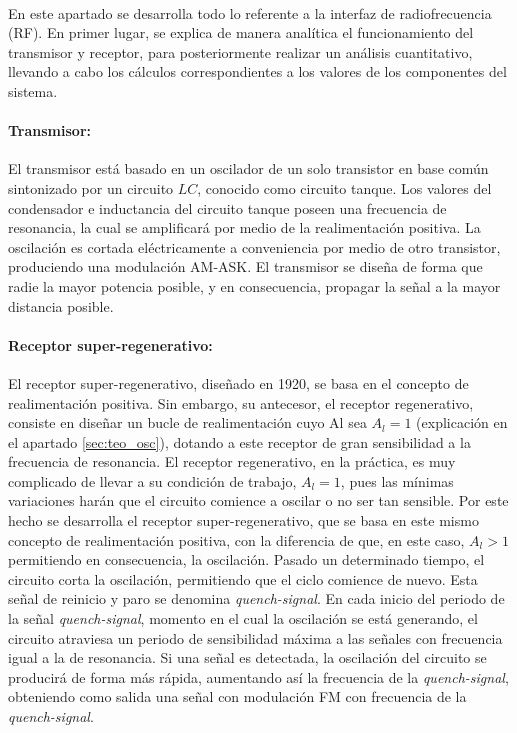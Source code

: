 \paragraph{} En este apartado se desarrolla todo lo referente a la interfaz de radiofrecuencia (RF). En primer lugar, se explica de manera analítica el funcionamiento del transmisor y receptor, para posteriormente realizar un análisis cuantitativo, llevando a cabo los cálculos correspondientes a los valores de los componentes del sistema.

\paragraph{Transmisor:} El transmisor está basado en un oscilador de un solo transistor en base com\'un sintonizado por un circuito $LC$, conocido como circuito tanque.
Los valores del condensador e inductancia del circuito tanque poseen una frecuencia de resonancia, la cual se amplificar\'a por medio de la realimentación positiva. La oscilación es cortada eléctricamente a conveniencia por medio de otro transistor, produciendo una modulación AM-ASK. El transmisor se diseña de forma que radie la mayor potencia posible, y en consecuencia, propagar la señal a la mayor distancia posible.

\paragraph{Receptor super-regenerativo:} El receptor super-regenerativo, diseñado en 1920, se basa en el concepto de realimentación positiva. Sin embargo, su antecesor, el receptor regenerativo, consiste en diseñar un bucle de realimentación cuyo Al sea $A_l = 1$ (explicaci\'on en el apartado \ref{sec:teo_osc}), dotando a este receptor de gran sensibilidad a la frecuencia de resonancia. 
El receptor regenerativo, en la práctica, es muy complicado de llevar a su condici\'on de trabajo, $A_l = 1$, pues las mínimas variaciones harán que el circuito comience a oscilar o no ser tan sensible. Por este hecho se desarrolla el receptor super-regenerativo, que se basa en este mismo concepto de realimentación positiva, con la diferencia de que, en este caso, $A_l > 1$ permitiendo en consecuencia, la oscilaci\'on. Pasado un determinado tiempo, el circuito corta la oscilación, permitiendo que el ciclo comience de nuevo. Esta señal de reinicio y paro se denomina \textit{quench-signal}. En cada inicio del periodo de la señal \textit{quench-signal}, momento en el cual la oscilación se está generando, el circuito atraviesa un periodo de sensibilidad máxima a las señales con frecuencia igual a la de resonancia. Si una señal es detectada, la oscilación del circuito se producirá de forma más rápida, aumentando así la frecuencia de la \textit{quench-signal}, obteniendo como salida una señal con modulación FM con frecuencia de la \textit{quench-signal}.

